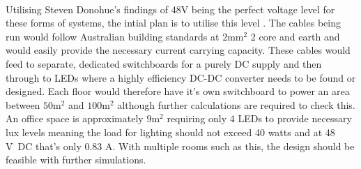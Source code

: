 \paragraph{}
Utilising Steven Donohue's findings of 48V being the perfect voltage level for these forms  of systems, the intial plan is to utilise this level \cite{Donohue2014}. The cables being run would follow Australian building standards at $2\text{mm}^{2}$ 2 core and earth and would easily provide the necessary current carrying capacity. These cables would feed to separate, dedicated switchboards for a purely DC supply and then through to LEDs where a highly efficiency DC-DC converter needs to be found or designed. Each floor would therefore have it's own switchboard to power an area between $50\text{m}^{2}$ and $100\text{m}^{2}$ although further calculations are required to check this. An office space is approximately $9\text{m}^{2}$ requiring only 4 LEDs to provide necessary lux levels meaning the load for lighting should not exceed 40 watts and at 48 \si{V DC} that's only 0.83 \si{A}. With multiple rooms such as this, the design should be feasible with further simulations.  

\newpage
